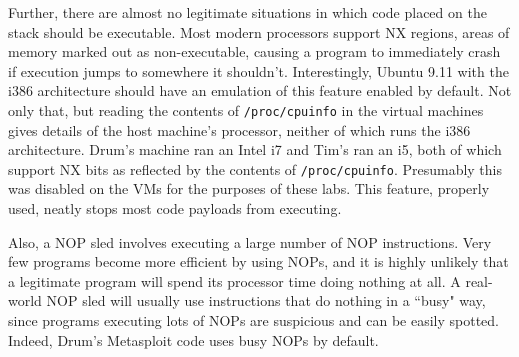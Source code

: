 Further, there are almost no legitimate situations in which code placed on the stack should be executable. Most modern
processors support NX regions, areas of memory marked out as non-executable, causing a program to immediately crash if
execution jumps to somewhere it shouldn't. Interestingly, Ubuntu 9.11 with the i386 architecture should have an
emulation of this feature enabled by default. %
Not only that, but reading the contents of {\tt /proc/cpuinfo} in the virtual machines gives details of the host
machine's processor, neither of which runs the i386 architecture. Drum's machine ran an Intel i7 and Tim's ran an i5,
both of which support NX bits as reflected by the contents of {\tt /proc/cpuinfo}.
Presumably this was disabled on the VMs for the purposes of these labs. This feature, properly used, neatly stops most
code payloads from executing.

Also, a NOP sled involves executing a large number of NOP instructions. Very few programs become more efficient by using
NOPs,%
and it is highly unlikely that a legitimate program will spend its processor time doing nothing at all. A real-world NOP
sled will usually use instructions that do nothing in a ``busy" way, %
since programs executing lots of NOPs are suspicious and can be easily spotted. Indeed, Drum's Metasploit code uses busy
NOPs by default.

